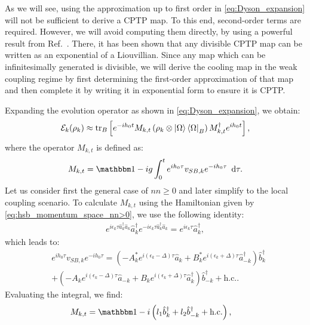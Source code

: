 As we will see, using the approximation up to first order in \cref{eq:Dyson_expansion} will not be sufficient to derive a CPTP map. To this end, second-order terms are required. However, we will avoid computing them directly, by using a powerful result from Ref.~\cite{Wolf2008Dividing}. There, it has been shown that any divisible CPTP map can be written as an exponential of a Liouvillian. Since any map which can be infinitesimally generated is divisible, we will derive the cooling map in the weak coupling regime by first determining the first-order approximation of that map and then complete it by writing it in exponential form to ensure it is CPTP.

Expanding the evolution operator as shown in \cref{eq:Dyson_expansion}, we obtain:
\begin{equation}
    \mathcal{E}_k(\rho_k) \approx \operatorname{tr}_B \left[ e^{-i h_0 t} M_{k,t} \left( \rho_k \otimes \ket{\Omega}\bra{\Omega}_B \right) M_{k,t}^\dag e^{i h_0 t} \right],
    \label{eq:expanded_map}
\end{equation}
where the operator $M_{k,t}$ is defined as:
\begin{equation}
    M_{k,t} = \Id - i g\int_0^t e^{i h_0 \tau} v_{SB,k} e^{-i h_0 \tau}~ \dd\tau.
    \label{eq:MT_definition}
\end{equation}
Let us consider first the general case of $nn\geq 0$ and later simplify to the local coupling scenario. To calculate $M_{k,t}$ using the Hamiltonian given by \cref{eq:hsb_momentum_space_nn>0}, we use the following identity:
\begin{align}
    e^{i\epsilon_k \tau\hat{a}_k^\dag\hat{a}_k}\hat{a}_k^\dag e^{-i\epsilon_k \tau\hat{a}_k^\dag\hat{a}_k}=e^{i\epsilon_k \tau}\hat{a}_k^\dag,
\end{align}
which leads to:
\begin{align}
    \label{eq:Vk_interaction_picture}
     &e^{i h_0 \tau} v_{SB,k} e^{-i h_0 \tau}=\left(-A_k^*e^{i(\epsilon_k-\Delta)\tau}\hat{a}_k+B_k^*e^{i(\epsilon_k+\Delta)\tau}\hat{a}_{-k}^\dag\right)\hat{b}_{k}^\dag\nonumber\\
     &+\left(-A_k e^{i(\epsilon_k-\Delta)\tau}\hat{a}_{-k}+B_k e^{i(\epsilon_k+\Delta)\tau}\hat{a}_{k}^\dag\right)\hat{b}_{-k}^\dag+ \text{h.c.}.
\end{align}
Evaluating the integral, we find:
\begin{align}
    M_{k,t} &= \Id -i \left( l_1 \hat{b}_k^\dag + l_2 \hat{b}_{-k}^\dag + \text{h.c.} \right),
    \label{eq:MT_with_jump_operators}
\end{align}
